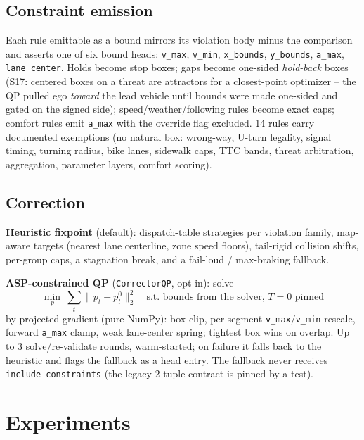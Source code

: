 \documentclass[11pt]{article}
\begin{document}
\subsection{Constraint emission}
Each rule emittable as a bound mirrors its violation body minus the
comparison and asserts one of six bound heads: \texttt{v\_max},
\texttt{v\_min}, \texttt{x\_bounds}, \texttt{y\_bounds},
\texttt{a\_max}, \texttt{lane\_center}. Holds become stop boxes;
gaps become one-sided \emph{hold-back} boxes (S17: centered boxes on
a threat are attractors for a closest-point optimizer -- the QP
pulled ego \emph{toward} the lead vehicle until bounds were made
one-sided and gated on the signed side); speed/weather/following
rules become exact caps; comfort rules emit \texttt{a\_max} with the
override flag excluded. 14 rules carry documented exemptions (no
natural box: wrong-way, U-turn legality, signal timing, turning
radius, bike lanes, sidewalk caps, TTC bands, threat arbitration,
aggregation, parameter layers, comfort scoring).

\subsection{Correction}
\textbf{Heuristic fixpoint} (default): dispatch-table strategies per
violation family, map-aware targets (nearest lane centerline, zone
speed floors), tail-rigid collision shifts, per-group caps, a
stagnation break, and a fail-loud / max-braking fallback.

\textbf{ASP-constrained QP} (\texttt{CorrectorQP}, opt-in): solve
\[
\min_{p}\ \sum_t \lVert p_t - p^{0}_t \rVert_2^2 \quad
\text{s.t. bounds from the solver, } T{=}0 \text{ pinned}
\]
by projected gradient (pure NumPy): box clip, per-segment
\texttt{v\_max}/\texttt{v\_min} rescale, forward \texttt{a\_max}
clamp, weak lane-center spring; tightest box wins on overlap. Up to
3 solve/re-validate rounds, warm-started; on failure it falls back
to the heuristic and flags the fallback as a head entry. The
fallback never receives \texttt{include\_constraints} (the legacy
2-tuple contract is pinned by a test).

\section{Experiments}
\label{sec:experiments}
\end{document}
